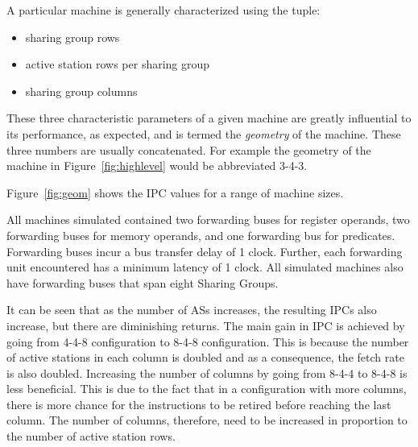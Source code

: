 \documentclass[10pt,twocolumn]{IEEEtran}
\begin{document}
A particular machine is generally characterized using the tuple:
%
\begin{itemize}
\item sharing group rows
\item active station rows per sharing group
\item sharing group columns
\end{itemize}
%
These three characteristic parameters of a given machine are
greatly influential to its performance, as expected, and is termed
the \emph{geometry} of the machine.  These three numbers are usually
concatenated.  For example the geometry of the machine in
Figure~\ref{fig:highlevel} would be abbreviated 3-4-3.

Figure~\ref{fig:geom} shows the IPC values for a range of machine sizes.
%
\begin{figure*}[bh]
\caption{Effect of Geometry on IPC}
\label{fig:geom}
\end{figure*}
%
All machines simulated contained two forwarding buses for
register operands, two forwarding buses for memory operands, and
one forwarding bus for predicates.
Forwarding buses incur a bus transfer delay of 1 clock.
Further, each forwarding unit encountered 
has a minimum latency of 1 clock.
All simulated machines also have forwarding buses
that span eight Sharing Groups. 


It can be seen that as the number of ASs increases,
the resulting IPCs also increase, but there are diminishing returns.
The main gain in IPC is achieved by going from 4-4-8 configuration 
to 8-4-8 configuration.  This is because the number of active stations
in each column is doubled and as a consequence, the fetch rate is also
doubled.  
Increasing the number of columns by going from 8-4-4 to 8-4-8 is less
beneficial.  This is due to the fact that in a configuration with more
columns, there is more chance for the instructions to be retired before
reaching the last column.  The number of columns, therefore, need to be
increased in proportion to the number of active station rows.
\end{document}
